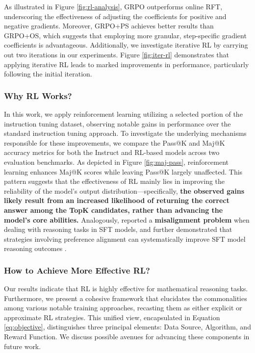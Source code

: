 \begin{itemize}[topsep=0pt]
\begin{itemize}[topsep=0pt]
As illustrated in Figure \ref{fig:rl-analysis}, GRPO outperforms online RFT, underscoring the effectiveness of adjusting the coefficients for positive and negative gradients. Moreover, GRPO+PS achieves better results than GRPO+OS, which suggests that employing more granular, step-specific gradient coefficients is advantageous. Additionally, we investigate iterative RL by carrying out two iterations in our experiments. Figure \ref{fig:iter-rl} demonstrates that applying iterative RL leads to marked improvements in performance, particularly following the initial iteration.

\subsubsection{Why RL Works?} In this work, we apply reinforcement learning utilizing a selected portion of the instruction tuning dataset, observing notable gains in performance over the standard instruction tuning approach. To investigate the underlying mechanisms responsible for these improvements, we compare the Pass@K and Maj@K accuracy metrics for both the Instruct and RL-based models across two evaluation benchmarks. As depicted in Figure \ref{fig:maj-pass}, reinforcement learning enhances Maj@K scores while leaving Pass@K largely unaffected. This pattern suggests that the effectiveness of RL mainly lies in improving the reliability of the model's output distribution—specifically, \textbf{the observed gains likely result from an increased likelihood of returning the correct answer among the TopK candidates, rather than advancing the model’s core abilities.} Analogously, \citep{wang2023making} reported a \textbf{misalignment problem} when dealing with reasoning tasks in SFT models, and further demonstrated that strategies involving preference alignment can systematically improve SFT model reasoning outcomes \citep{yuan2023rrhf,song2023preference,wang2023making}.

\subsubsection{How to Achieve More Effective RL?}
\label{sec:effec_rl}
Our results indicate that RL is highly effective for mathematical reasoning tasks. Furthermore, we present a cohesive framework that elucidates the commonalities among various notable training approaches, recasting them as either explicit or approximate RL strategies. This unified view, encapsulated in Equation \ref{eq:objective}, distinguishes three principal elements: Data Source, Algorithm, and Reward Function. We discuss possible avenues for advancing these components in future work.


\end{itemize}
\end{itemize}
